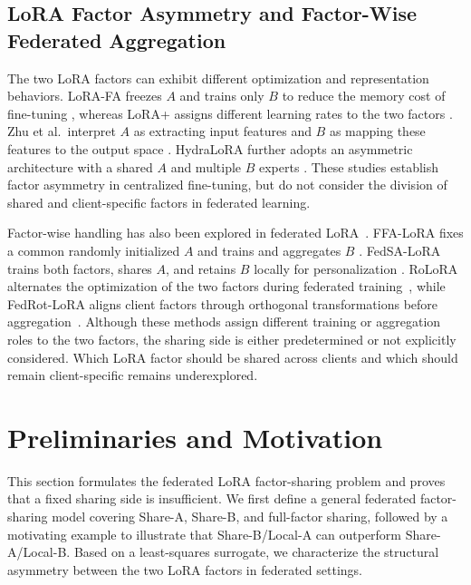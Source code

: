 \documentclass[lettersize,journal]{IEEEtran}
\begin{document}
	
	\subsection{LoRA Factor Asymmetry and Factor-Wise Federated Aggregation}
	The two LoRA factors can exhibit different optimization and representation behaviors. LoRA-FA freezes $A$ and trains only $B$ to reduce the memory cost of fine-tuning \cite{zhang2023lorafa}, whereas LoRA+ assigns different learning rates to the two factors \cite{hayou2024loraplus}. Zhu et al.\ interpret $A$ as extracting input features and $B$ as mapping these features to the output space \cite{zhu2024asymmetry}. HydraLoRA further adopts an asymmetric architecture with a shared $A$ and multiple $B$ experts \cite{tian2024hydralora}. These studies establish factor asymmetry in centralized fine-tuning, but do not consider the division of shared and client-specific factors in federated learning.
	
	Factor-wise handling has also been explored in federated LoRA~\cite{chen2026fedotab,wang2026iflora,xu2025yoco}. FFA-LoRA fixes a common randomly initialized $A$ and trains and aggregates $B$ \cite{sun2024improving}. FedSA-LoRA trains both factors, shares $A$, and retains $B$ locally for personalization \cite{guo2025selective}. RoLoRA alternates the optimization of the two factors during federated training~\cite{chen2025rolora}, while FedRot-LoRA aligns client factors through orthogonal transformations before aggregation~\cite{zhang2026fedrotlora}. Although these methods assign different training or aggregation roles to the two factors, the sharing side is either predetermined or not explicitly considered. Which LoRA factor should be shared across clients and which should remain client-specific remains underexplored.
	
	
	\section{Preliminaries and Motivation}
	\label{sec:preliminaries}
	
	This section formulates the federated LoRA factor-sharing problem and proves that a fixed sharing side is insufficient. 
	We first define a general federated factor-sharing model covering Share-A, Share-B, and full-factor sharing, followed by a motivating example to illustrate that Share-B/Local-A can outperform Share-A/Local-B. 
	Based on a least-squares surrogate, we characterize the structural asymmetry between the two LoRA factors in federated settings.
	
\end{document}
